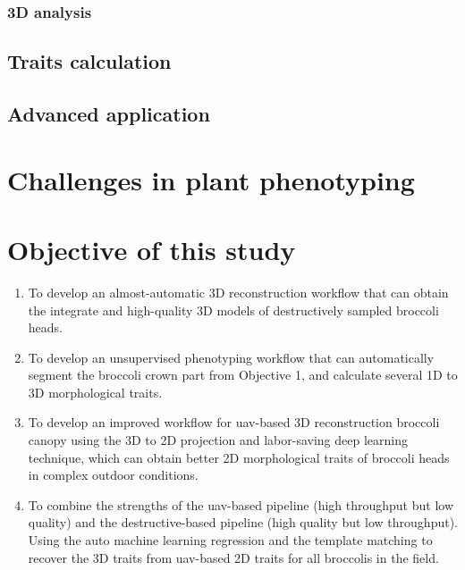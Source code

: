 

\subsubsection{3D analysis}





\subsection{Traits calculation}




\subsection{Advanced application}


\section{Challenges in plant phenotyping}



\section{Objective of this study}

\begin{enumerate}
    \item To develop an almost-automatic 3D reconstruction workflow that can obtain the integrate and high-quality 3D models of destructively sampled broccoli heads.
    \item To develop an unsupervised phenotyping workflow that can automatically segment the broccoli crown part from Objective 1, and calculate several 1D to 3D morphological traits.
    \item To develop an improved workflow for \gls{uav}-based 3D reconstruction broccoli canopy using the 3D to 2D projection and labor-saving deep learning technique, which can obtain better 2D morphological traits of broccoli heads in complex outdoor conditions.
    \item To combine the strengths of the \gls{uav}-based pipeline (high throughput but low quality) and the destructive-based pipeline (high quality but low throughput). Using the auto machine learning regression and the template matching to recover the 3D traits from \gls{uav}-based 2D traits for all broccolis in the field.

\end{enumerate}


